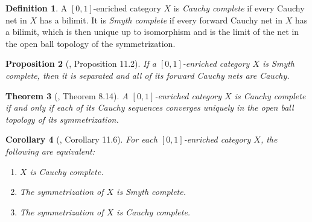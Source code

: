 \documentclass[preprint,3p,times]{elsarticle}
\theoremstyle{plain}
\newtheorem{thm}{Theorem}[section]
\newtheorem{prop}[thm]{Proposition}
\newtheorem{cor}[thm]{Corollary}
\theoremstyle{definition}
\newtheorem{definition}[thm]{Definition}
\numberwithin{equation}{section}
\begin{document}
\begin{definition}
A \([0,1]\)-enriched category \(X\) is \emph{Cauchy complete} if every Cauchy net in \(X\) has a
bilimit. It is \emph{Smyth complete} if every forward Cauchy net in \(X\) has a bilimit, which is
then unique up to isomorphism and is the limit of the net in the open ball topology of the
symmetrization.
\end{definition}
\begin{prop}[\cite{Zhang2024IntroductoryNO}, Proposition 11.2]\label{forward Cauchy=Cauchy}
    If a \([0,1]\)-enriched category $X$ is Smyth complete, then it is separated and all of its forward Cauchy nets are Cauchy.
\end{prop}

\begin{thm}[\cite{Zhang2024IntroductoryNO}, Theorem 8.14]\label{thm:cauchy-complete-sequences}
A \([0,1]\)-enriched category \(X\) is Cauchy complete if and only if
each of its Cauchy sequences converges uniquely in the open ball topology of its
symmetrization.
\end{thm}
\begin{cor}[\cite{Zhang2024IntroductoryNO}, Corollary 11.6]\label{Cauchy complete and Smyth complete}
    For each \([0,1]\)-enriched category $X$, the following are equivalent:
\begin{enumerate}[label={\textup{(\arabic*)}}]
    \item $X$ is Cauchy complete.
    \item The symmetrization of $X$ is Smyth complete.
    \item The symmetrization of $X$ is Cauchy complete.
\end{enumerate}
\end{cor}
\end{document}
